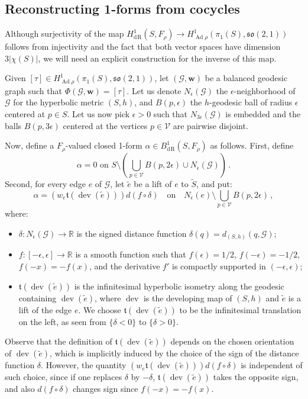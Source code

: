 \documentclass[11pt]{article}
\theoremstyle{definition}
\numberwithin{equation}{section}
\numberwithin{figure}{section}
\numberwithin{table}{section}
\newcommand{\R}{{\mathbb R}}
\newcommand{\so}{\mathfrak{so}}
\DeclareMathOperator{\dev}{dev}
\DeclareMathOperator{\Ad}{Ad}
\DeclareMathOperator{\rham}{d\! R}
\begin{document}
\subsection{Reconstructing 1-forms from cocycles} Although surjectivity of the map $H^1_{\rham}(S,F_\rho)\to H^1_{\Ad\rho}(\pi_1(S),\so(2,1))$ follows from injectivity and the fact that both vector spaces have dimension~$3|\chi(S)|$, we will need an explicit construction for the inverse of this map.

Given $[\tau]\in H^1_{\Ad\rho}(\pi_1(S),\so(2,1))$, let $(\mathcal G,\mathbf w)$ be a balanced geodesic graph such that $\Phi(\mathcal G,\mathbf w)=[\tau]$. Let us denote $N_\epsilon(\mathcal G)$ the $\epsilon$-neighborhood of $\mathcal G$ for the hyperbolic metric $(S,h)$, and $B(p,\epsilon)$ the $h$-geodesic ball of radius $\epsilon$ centered at $p\in S$. Let us now pick $\epsilon>0$ such that $N_{3\epsilon}(\mathcal G)$ is embedded and the balls $B(p,3\epsilon)$ centered at the vertices $p\in\mathcal V$ are pairwise disjoint.

Now, define a $F_\rho$-valued closed 1-form $\alpha\in B^1_{\rham}(S,F_\rho)$ as follows. First, define
\[
\alpha=0\text{ on }S\setminus \left(\bigcup_{p\in\mathcal V}B(p,2\epsilon)\cup N_\epsilon(\mathcal G)\right)\,.
\]
Second, for every edge $e$ of $\mathcal G$, let $\widetilde e$ be a lift of $e$ to $\widetilde S$, and put:
\begin{equation}\label{eq defi derham form}
\alpha=\left(w_e {\mathfrak t}(\dev(\widetilde e))\right) d(f\circ \delta)\quad\text{on}\quad N_\epsilon(e)\setminus \bigcup_{p\in\mathcal V}B(p,2\epsilon)\,,
\end{equation}
where:
\begin{itemize}
\item $\delta:N_\epsilon(\mathcal G)\to\R$ is the signed distance function $\delta(q)=d_{(S,h)}(q,\mathcal G)$;
\item $f:[-\epsilon,\epsilon]\to \R$ is a smooth function such that $f(\epsilon)=1/2$, $f(-\epsilon)=-1/2$, $f(-x)=-f(x)$, and the derivative $f'$ is compactly supported in $(-\epsilon,\epsilon)$;
\item $\mathfrak t(\dev(\widetilde e))$ is the infinitesimal hyperbolic isometry along the geodesic containing $\dev(\widetilde e)$, where $\dev$ is the developing map of $(S,h)$ and $\widetilde e$ is a lift of the edge $e$. We choose $\mathfrak t(\dev(\widetilde e))$ to be the infinitesimal translation on the left, as seen from $\{\delta<0\}$ to $\{\delta>0\}$.
\end{itemize}
Observe that the definition of $\mathfrak t(\dev(\widetilde e))$ depends on the chosen orientation of $\dev(\widetilde e)$, which is implicitly induced by the choice of the sign of the distance function $\delta$. However, the quantity $\left(w_e {\mathfrak t}(\dev(\widetilde e))\right) d(f\circ \delta)$ is independent of such choice, since if one replaces $\delta$ by $-\delta$, ${\mathfrak t}(\dev(\widetilde e))$ takes the opposite sign, and also $d(f\circ \delta)$ changes sign since $f(-x)=-f(x)$.
\end{document}
